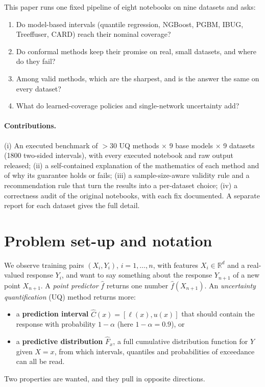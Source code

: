 \documentclass[11pt]{article}
\begin{document}
This paper runs one fixed pipeline of eight notebooks on nine datasets and asks:
\begin{enumerate}[label=\textbf{Q\arabic*.}]
\item Do model-based intervals (quantile regression, NGBoost, PGBM, IBUG, Treeffuser, CARD) reach their nominal coverage?
\item Do conformal methods keep their promise on real, small datasets, and where do they fail?
\item Among valid methods, which are the sharpest, and is the answer the same on every dataset?
\item What do learned-coverage policies and single-network uncertainty add?
\end{enumerate}
\paragraph{Contributions.} (i) An executed benchmark of $>30$ UQ methods $\times$ 9 base models $\times$ 9 datasets (1800 two-sided intervals), with every executed notebook and raw output released; (ii) a self-contained explanation of the
mathematics of each method and of why its guarantee holds or fails; (iii) a sample-size-aware validity rule and a recommendation rule that turn the
results into a per-dataset choice; (iv) a correctness audit of the original notebooks, with each fix documented. A separate report for each
dataset gives the full detail.

\section{Problem set-up and notation}\label{sec:setup}
We observe training pairs $(X_i,Y_i)$, $i=1,\dots,n$, with features $X_i\in\mathbb R^d$ and a real-valued response
$Y_i$, and want to say something about the response $Y_{n+1}$ of a new point $X_{n+1}$. A \emph{point predictor}
$\hat f$ returns one number $\hat f(X_{n+1})$. An \emph{uncertainty quantification} (UQ) method returns more:
\begin{itemize}
\item a \textbf{prediction interval} $\hat C(x)=[\ell(x),u(x)]$ that should contain the response with probability
$1-\alpha$ (here $1-\alpha=0.9$), or
\item a \textbf{predictive distribution} $\hat F_x$, a full cumulative distribution function for $Y$ given $X=x$, from which
intervals, quantiles and probabilities of exceedance can all be read.
\end{itemize}
Two properties are wanted, and they pull in opposite directions.
\end{document}
